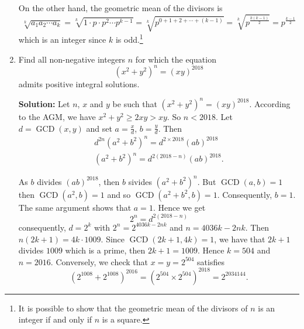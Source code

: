 \documentclass{article}
\newcommand{\solution}[1]{%
\ifsolutions%
    \textbf{Solution: } #1
\fi
}
\begin{document}
\begin{enumerate}
{On the other hand, the geometric mean of the divisors is
\[
  \sqrt[k]{a_1 a_2 \cdots a_k} = \sqrt[k]{1 \cdot p \cdot p^2 \cdots p^{k - 1}} = \sqrt[k]{p^{0 + 1 + 2 + \cdots + (k-1)}} = \sqrt[k]{p^{\frac{k(k-1)}{2}}} = p^{\frac{k-1}{2}}
\]
which is an integer since $k$ is odd.\footnote{It is possible to show that the geometric mean of the divisors of $n$ is an integer if and only if $n$ is a square.}}

\item Find all non-negative integers $n$ for which the equation
\[
    {\left( x^2 + y^2 \right)}^n = {(xy)}^{2018}
\]
admits positive integral solutions.

\solution{Let $n$, $x$ and $y$ be such that ${(x^2 + y^2)}^n = {(xy)}^{2018}$. According to the AGM, we have $x^2 + y^2 \geq 2xy > xy$. So $n < 2018$. Let $d = \operatorname{GCD}(x, y)$ and set $a = \frac{x}{d}$, $b = \frac{y}{d}$. Then
\begin{eqnarray*}
    d^{2n} {(a^2 + b^2)}^n = d^{2 \times 2018} {(ab)}^{2018} \\
    {(a^2 + b^2)}^n = d^{2(2018 - n)} {(ab)}^{2018}.
\end{eqnarray*}

As $b$ divides ${(ab)}^{2018}$, then $b$ sivides ${(a^2 + b^2)}^n$. But $\operatorname{GCD}(a, b) = 1$ then $\operatorname{GCD}(a^2, b) = 1$ and so $\operatorname{GCD}(a^2 + b^2, b) = 1$. Consequently, $b = 1$. The same argument shows that $a = 1$. Hence we get
\[
    2^n = d^{2(2018 - n)}
\]
consequently, $d = 2^k$ with $2^n = 2^{4036k - 2nk}$ and $n = 4036k - 2nk$. Then $n(2k + 1) = 4k \cdot 1009$. Since $\operatorname{GCD}(2k + 1, 4k) = 1$, we have that $2k + 1$ divides $1009$ which is a prime, then $2k + 1 = 1009$. Hence $k = 504$ and $n = 2016$. Conversely, we check that $x = y = 2^{504}$ satisfies
\[
    {( 2^{1008} + 2^{1008} )}^{2016} = {( 2^{504} \times 2^{504} )}^{2018} = 2^{2034144}.
\]}

\end{enumerate}
\end{document}
